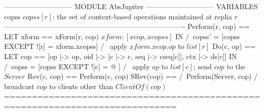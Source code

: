 \documentclass{article}
\begin{document}
\begin{tla}
----------------------------- MODULE AbsJupiter -----------------------------
VARIABLES copss \* $copss[r]$: the set of context-based operations maintained at replia $r$
----------------------------------------------------------------------------
Perform(r, cop) == LET xform == xForm(r, cop) \* $xform: [xcop, xcopss]$
                   IN  /\ copss' = [copss EXCEPT ![r] = xform.xcopss]
                       /\ \* apply $xform.xcop.op$ to $list[r]$
Do(c, op) == LET cop == [op |-> op, oid |-> [c |-> c, seq |-> cseq[c]], ctx |-> ds[c]]
             IN  /\ copss = [copss EXCEPT ![c] = @ ]
                 /\ \* apply $op$ to $list[c]$; send $cop$ to the $Server$
Rev(c, cop) == Perform(c, cop)
SRev(cop) == /\ Perform(Server, cop)
             /\ \* broadcast $cop$ to clients other than $ClientOf(cop)$
=============================================================================
\end{tla}
\end{document}
